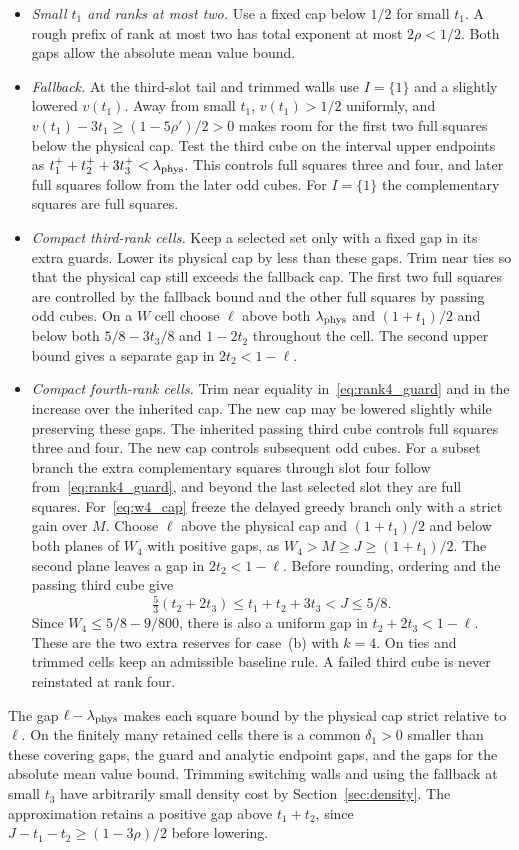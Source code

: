 \documentclass[11pt,reqno]{amsart}
\theoremstyle{remark}
\numberwithin{equation}{section}
\begin{document}
\begin{itemize}
\item \emph{Small $t_1$ and ranks at most two.} Use a fixed cap below $1/2$ for small $t_1$. A rough prefix of rank at most two has total exponent at most $2\rho<1/2$. Both gaps allow the absolute mean value bound.
\item \emph{Fallback.} At the third-slot tail and trimmed walls use $I=\{1\}$ and a slightly lowered $v(t_1)$. Away from small $t_1$, $v(t_1)>1/2$ uniformly, and $v(t_1)-3t_1\ge(1-5\rho')/2>0$ makes room for the first two full squares below the physical cap. Test the third cube on the interval upper endpoints as $t_1^++t_2^++3t_3^+<\lambda_{\rm phys}$. This controls full squares three and four, and later full squares follow from the later odd cubes. For $I=\{1\}$ the complementary squares are full squares.
\item \emph{Compact third-rank cells.} Keep a selected set only with a fixed gap in its extra guards. Lower its physical cap by less than these gaps. Trim near ties so that the physical cap still exceeds the fallback cap. The first two full squares are controlled by the fallback bound and the other full squares by passing odd cubes. On a $W$ cell choose $\ell$ above both $\lambda_{\rm phys}$ and $(1+t_1)/2$ and below both $5/8-3t_3/8$ and $1-2t_2$ throughout the cell. The second upper bound gives a separate gap in $2t_2<1-\ell$.
\item \emph{Compact fourth-rank cells.} Trim near equality in~\eqref{eq:rank4_guard} and in the increase over the inherited cap. The new cap may be lowered slightly while preserving these gaps. The inherited passing third cube controls full squares three and four. The new cap controls subsequent odd cubes. For a subset branch the extra complementary squares through slot four follow from~\eqref{eq:rank4_guard}, and beyond the last selected slot they are full squares. For~\eqref{eq:w4_cap} freeze the delayed greedy branch only with a strict gain over $M$. Choose $\ell$ above the physical cap and $(1+t_1)/2$ and below both planes of $W_4$ with positive gaps, as $W_4>M\ge J\ge(1+t_1)/2$. The second plane leaves a gap in $2t_2<1-\ell$. Before rounding, ordering and the passing third cube give
\[
\tfrac53(t_2+2t_3)\le t_1+t_2+3t_3<J\le 5/8.
\]
Since $W_4\le 5/8-9/800$, there is also a uniform gap in $t_2+2t_3<1-\ell$. These are the two extra reserves for case~(b) with $k=4$. On ties and trimmed cells keep an admissible baseline rule. A failed third cube is never reinstated at rank four.
\end{itemize}
The gap $\ell-\lambda_{\rm phys}$ makes each square bound by the physical cap strict relative to $\ell$. On the finitely many retained cells there is a common $\delta_1>0$ smaller than these covering gaps, the guard and analytic endpoint gaps, and the gaps for the absolute mean value bound. Trimming switching walls and using the fallback at small $t_3$ have arbitrarily small density cost by Section~\ref{sec:density}. The approximation retains a positive gap above $t_1+t_2$, since $J-t_1-t_2\ge(1-3\rho)/2$ before lowering.
\end{document}
